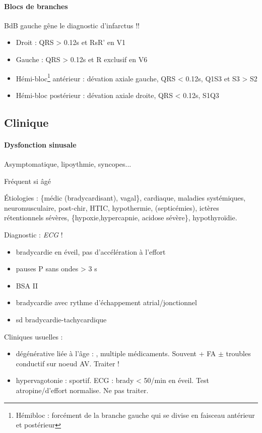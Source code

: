 \paragraph{Blocs de branches}
\danger{} BdB gauche gêne le diagnostic d'infarctus !!
\begin{itemize}
  \item Droit : QRS > 0.12s et RsR' en V1 
  \item Gauche : QRS > 0.12s et R exclusif en V6 
  \item Hémi-bloc\footnote{Hémibloc : forcément de la branche gauche qui se
    divise en faisceau antérieur et postérieur} antérieur : dévation axiale gauche, QRS < 0.12s, Q1S3 et S3 > S2
  \item Hémi-bloc postérieur : dévation axiale droite, QRS < 0.12s, S1Q3

\end{itemize}

\subsection{Clinique}
\paragraph{Dysfonction sinusale}
Asymptomatique, lipoythmie, syncopes...

Fréquent si âgé

Étiologies : \{médic (bradycardisant), vagal\}, cardiaque, maladies systémiques, neuromusculaire,
post-chir, HTIC, hypothermie, (septicémies), ictères rétentionnels sévères,
\{hypoxie,hypercapnie, acidose sévère\}, hypothyroïdie.

Diagnostic : \textit{ECG} ! 
\begin{itemize}
  \item bradycardie en éveil, pas d'accélération à l'effort
  \item pauses P sans ondes > 3 s
  \item BSA II
  \item bradycardie avec rythme d'échappement atrial/jonctionnel
  \item sd bradycardie-tachycardique
\end{itemize}

Cliniques usuelles :
\begin{itemize}
  \item dégénérative liée à l'âge : \female, multiple médicaments. Souvent + FA
    $\pm$ troubles conductif sur noeud AV. Traiter !
  \item hypervagotonie : sportif. ECG : brady < 50/min en éveil. Test
    atropine/d'effort normalise. Ne pas traiter.
\end{itemize}

